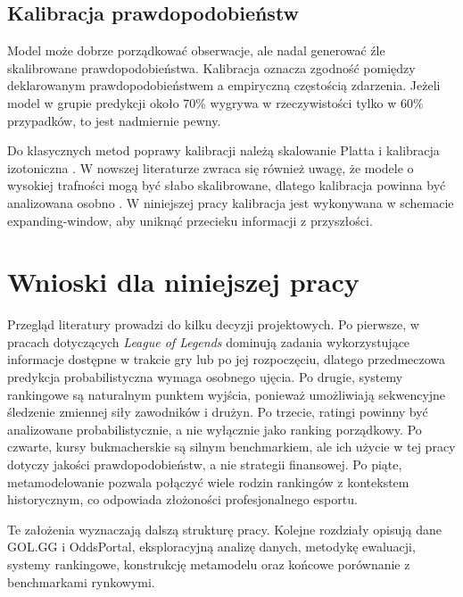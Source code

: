 \subsection{Kalibracja prawdopodobieństw}

Model może dobrze porządkować obserwacje, ale nadal generować źle skalibrowane prawdopodobieństwa.
Kalibracja oznacza zgodność pomiędzy deklarowanym prawdopodobieństwem a empiryczną częstością
zdarzenia. Jeżeli model w grupie predykcji około 70\% wygrywa w rzeczywistości tylko w 60\%
przypadków, to jest nadmiernie pewny.

Do klasycznych metod poprawy kalibracji należą skalowanie Platta i kalibracja izotoniczna
\parencite{zadrozny2002calibration,niculescu2005probabilities}. W nowszej literaturze zwraca się
również uwagę, że modele o wysokiej trafności mogą być słabo skalibrowane, dlatego kalibracja
powinna być analizowana osobno \parencite{guo2017calibration}. W niniejszej pracy kalibracja jest
wykonywana w schemacie expanding-window, aby uniknąć przecieku informacji z przyszłości.

\section{Wnioski dla niniejszej pracy}

Przegląd literatury prowadzi do kilku decyzji projektowych. Po pierwsze, w pracach dotyczących
\textit{League of Legends} dominują zadania wykorzystujące informacje dostępne w trakcie gry lub po
jej rozpoczęciu, dlatego przedmeczowa predykcja probabilistyczna wymaga osobnego ujęcia. Po drugie,
systemy rankingowe są naturalnym punktem wyjścia, ponieważ umożliwiają sekwencyjne śledzenie
zmiennej siły zawodników i drużyn. Po trzecie, ratingi powinny być analizowane probabilistycznie, a
nie wyłącznie jako ranking porządkowy. Po czwarte, kursy bukmacherskie są silnym benchmarkiem, ale
ich użycie w tej pracy dotyczy jakości prawdopodobieństw, a nie strategii finansowej. Po piąte,
metamodelowanie pozwala połączyć wiele rodzin rankingów z kontekstem historycznym, co odpowiada
złożoności profesjonalnego esportu.

Te założenia wyznaczają dalszą strukturę pracy. Kolejne rozdziały opisują dane GOL.GG i OddsPortal,
eksploracyjną analizę danych, metodykę ewaluacji, systemy rankingowe, konstrukcję metamodelu oraz
końcowe porównanie z benchmarkami rynkowymi.
